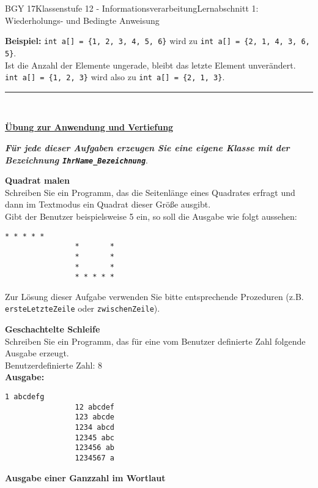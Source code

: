\documentclass[oneside,openany,headings=optiontotoc,11pt,numbers=noenddot]{scrreprt}
\begin{document}
\begin{worksheet}{BGY 17}{Klassenstufe 12 - Informationsverarbeitung}{Lernabschnitt 1: Wiederholungs- und Bedingte Anweisung}
\begin{framed}
			\textbf{Beispiel:} \lstinline[style=JavaInputStyle]|int a[] = {1, 2, 3, 4, 5, 6}| wird zu \lstinline[style=JavaInputStyle]|int a[] = {2, 1, 4, 3, 6, 5}|.\\
			Ist die Anzahl der Elemente ungerade, bleibt das letzte Element unverändert.\\
			\lstinline[style=JavaInputStyle]|int a[] = {1, 2, 3}| wird also zu \lstinline[style=JavaInputStyle]|int a[] = {2, 1, 3}|.\\
			\par\noindent
			\rule{\textwidth}{0.1pt}\\
			\par\noindent
			\large{\textbf{\underline{Übung zur Anwendung und Vertiefung}}}\\
			\normalsize
			\par\noindent
			\textit{\textbf{Für jede dieser Aufgaben erzeugen Sie eine eigene Klasse mit der Bezeichnung \lstinline[style=JavaInputStyle]|IhrName_Bezeichnung|}}.\\
			\par\noindent
			\textbf{Quadrat malen}\\
			Schreiben Sie ein Programm, das die Seitenlänge eines Quadrates erfragt und dann im Textmodus ein Quadrat dieser Größe ausgibt.\\
			Gibt der Benutzer beispielsweise 5 ein, so soll die Ausgabe wie folgt aussehen:\\
			\begin{lstlisting}[style=JavaInputStyle]
				* * * * *
				*       *
				*       *
				*       *
				* * * * *
			\end{lstlisting}
			Zur Lösung dieser Aufgabe verwenden Sie bitte entsprechende Prozeduren (z.B. \lstinline[style=JavaInputStyle]|ersteLetzteZeile| oder \lstinline[style=JavaInputStyle]|zwischenZeile|).\\
			\par\noindent
			\textbf{Geschachtelte Schleife}\\
			Schreiben Sie ein Programm, das für eine vom Benutzer definierte Zahl folgende Ausgabe erzeugt.\\
			Benutzerdefinierte Zahl: \(8\)\\
			\textbf{Ausgabe:}
			\begin{lstlisting}[style=JavaInputStyle]
				1 abcdefg
				12 abcdef
				123 abcde
				1234 abcd
				12345 abc
				123456 ab
				1234567 a
			\end{lstlisting}
			\par\noindent
			\textbf{Ausgabe einer Ganzzahl im Wortlaut}\\

\end{framed}
\end{worksheet}
\end{document}
